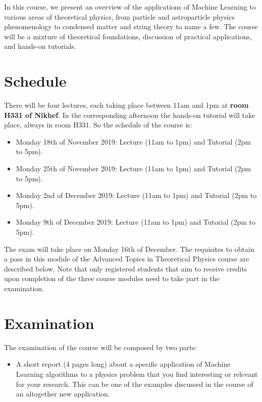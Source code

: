\documentclass[12pt]{article}
\numberwithin{equation}{section}
\begin{document}
\begin{spacing}{1.1}
In this course, we present an overview of the applications of Machine Learning to various areas of theoretical physics, from particle and astroparticle physics phenomenology to condensed matter and string theory to name a few. The course will be a mixture of theoretical foundations, discussion of practical applications, and hands-on tutorials.

\section{Schedule}

There will be four lectures, each taking place between 11am and 1pm
at {\bf room H331 of Nikhef}.
%
In the corresponding afternoon the hands-on tutorial
will take place, always in room H331. So the schedule of the course is:

\begin{itemize}

\item Monday 18th of November 2019: Lecture (11am to 1pm) and Tutorial (2pm to 5pm).

\item Monday 25th of November 2019: Lecture (11am to 1pm) and Tutorial (2pm to 5pm).

\item Monday 2nd of December 2019: Lecture (11am to 1pm) and Tutorial (2pm to 5pm).

\item Monday 9th of December 2019: Lecture (11am to 1pm) and Tutorial (2pm to 5pm).

\end{itemize}  

The exam will take place on Monday 16th of December.
%
The requisites to obtain a pass in this module of the Advanced Topics in Theoretical Physics
course are described below.
%
Note that only registered students that aim to receive credits
upon completion of the three course modules need to  take
part in the examination.

\section{Examination}

The examination of the course will be composed by two parts:

\begin{itemize}

\item A short report (4 pages long) about a specific application
  of Machine Learning algorithms
  to a physics problem that you find interesting
  or relevant for your research.
  This can be one of the examples discussed in the course
  of an altogether new application.


\end{itemize}
\end{spacing}
\end{document}
